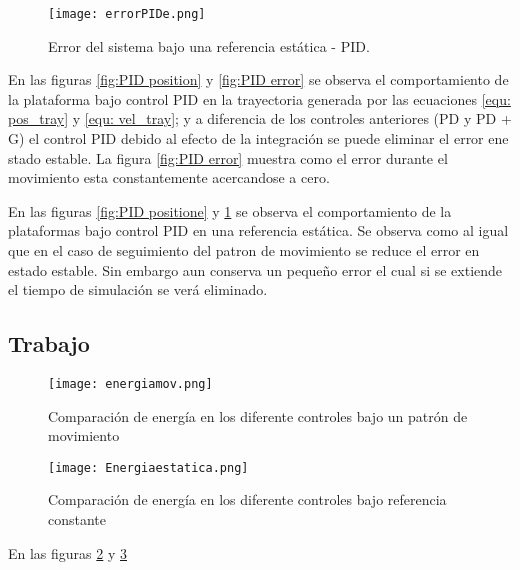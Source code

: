 \begin{figure}[H]
    \centering
    \texttt{[image: errorPIDe.png]}
    \caption{Error del sistema bajo una referencia estática - PID.}
    \label{fig:PID errore}
\end{figure}

En las figuras \ref{fig:PID position} y \ref{fig:PID error} se observa el comportamiento de la plataforma bajo control PID en la trayectoria generada por las ecuaciones \ref{equ: pos_tray} y \ref{equ: vel_tray}; y a diferencia de los controles anteriores (PD y PD + G) el control PID debido al efecto de la integración se puede eliminar el error ene stado estable. La figura \ref{fig:PID error} muestra como el error durante el movimiento esta constantemente acercandose a cero.

En las figuras \ref{fig:PID positione} y \ref{fig:PID errore} se observa el comportamiento de la plataformas bajo control PID en una referencia estática. Se observa como al igual que en el caso de seguimiento del patron de movimiento se reduce el error en estado estable. Sin embargo aun conserva un pequeño error el cual si se extiende el tiempo de simulación se verá eliminado.

\subsection{Trabajo}

\begin{figure}[H]
    \centering
    \texttt{[image: energiamov.png]}
    \caption{Comparación de energía en los diferente controles bajo un patrón de movimiento}
    \label{fig:energiamov}
\end{figure}

\begin{figure}[H]
    \centering
    \texttt{[image: Energiaestatica.png]}
    \caption{Comparación de energía en los diferente controles bajo referencia constante}
    \label{fig:energiaest}
\end{figure}

En las figuras \ref{fig:energiamov} y \ref{fig:energiaest} 